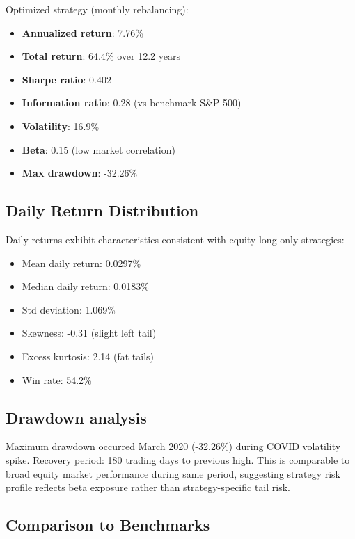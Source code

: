 \documentclass[twocolumn,ieee]{Base_Latex_Template/arithmaxresearch}
\begin{document}
Optimized strategy (monthly rebalancing):

\begin{itemize}
\item \textbf{Annualized return}: 7.76\%
\item \textbf{Total return}: 64.4\% over 12.2 years
\item \textbf{Sharpe ratio}: 0.402
\item \textbf{Information ratio}: 0.28 (vs benchmark S\&P 500)
\item \textbf{Volatility}: 16.9\%
\item \textbf{Beta}: 0.15 (low market correlation)
\item \textbf{Max drawdown}: -32.26\%
\end{itemize}

\subsection{Daily Return Distribution}

Daily returns exhibit characteristics consistent with equity long-only strategies:

\begin{itemize}
\item Mean daily return: 0.0297\%
\item Median daily return: 0.0183\%
\item Std deviation: 1.069\%
\item Skewness: -0.31 (slight left tail)
\item Excess kurtosis: 2.14 (fat tails)
\item Win rate: 54.2\%
\end{itemize}

\subsection{Drawdown analysis}

Maximum drawdown occurred March 2020 (-32.26\%) during COVID volatility spike. Recovery period: 180 trading days to previous high. This is comparable to broad equity market performance during same period, suggesting strategy risk profile reflects beta exposure rather than strategy-specific tail risk.

\subsection{Comparison to Benchmarks}
\end{document}
